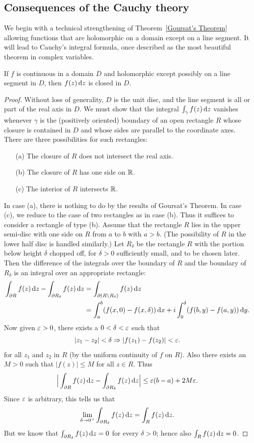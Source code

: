 \subsection{Consequences of the Cauchy theory}
We begin with a technical strengthening of Theorem~\ref{Goursat's Theorem} allowing functions that are holomorphic on a domain except on a line segment. It will lead to Cauchy's integral formula, once described as the most beautiful theorem in complex variables.
\begin{theorem}\label{Goursat's Theorem Strengthened}
If $f$ is continuous in a domain $D$ and holomorphic except possibly on a line segment in $D$, then $f(z)\mathop{}\!\mathrm{d} z$ is closed in $D$.
\end{theorem}
\begin{proof}
Without loss of generality, $D$ is the unit disc, and the line segment is all or part of the real axis in $D$. We must show that the integral $\int_{\gamma}f(z)\mathop{}\!\mathrm{d} z$ vanishes whenever $\gamma$ is the (positively oriented) boundary of an open rectangle $R$ whose closure is contained in $D$ and whose sides are parallel to the coordinate axes. There are three possibilities for such rectangles:
\begin{itemize}
\item[(a)] The closure of $R$ does not intersect the real axis.
\item[(b)] The closure of $R$ has one side on $\mathbb{R}$.
\item[(c)] The interior of $R$ intersects $\mathbb{R}$.
\end{itemize}
In case (a), there is nothing to do by the results of Goursat's Theorem. In case (c), we reduce to the case of two rectangles as in case (b). Thus it suffices to consider a rectangle of type (b). Assume that the rectangle $R$ lies in the upper semi-disc with one side on $R$ from $a$ to $b$ with $a>b$. (The possibility of $R$ in the lower half disc is handled similarly.) Let $R_{\delta}$ be the rectangle $R$ with the portion below height $\delta$ chopped off, for $\delta>0$ sufficiently small, and to be chosen later. Then the difference of the integrals over the boundary of $R$ and the boundary of $R_{\delta}$ is an integral over an appropriate rectangle:
\begin{align*}
\int_{\partial R}f(z)\mathop{}\!\mathrm{d} z-\int_{\partial R_{\delta}}f(z)\mathop{}\!\mathrm{d} z&=\int_{\partial(R\setminus R_{\delta})}f(z)\mathop{}\!\mathrm{d} z\\
&=\int_{a}^{b}(f(x,0)-f(x,\delta))\mathop{}\!\mathrm{d} x+i\int_{0}^{\delta}(f(b,y)-f(a,y))\mathop{}\!\mathrm{d} y.
\end{align*}
Now given $\varepsilon>0$, there exists a $0<\delta<\varepsilon$ such that
\[|z_1-z_2|<\delta\Rightarrow|f(z_1)-f(z_2)|<\varepsilon.\]
for all $z_1$ and $z_2$ in $R$ (by the uniform continuity of $f$ on $R$). Also there exists an $M>0$ such that $|f(z)|\leq M$ for all $z\in R$. Thus
\[\Big|\int_{\partial R}f(z)\mathop{}\!\mathrm{d} z-\int_{\partial R_{\delta}}f(z)\mathop{}\!\mathrm{d} z\Big|\leq\varepsilon(b-a)+2M\varepsilon.\]
Since $\varepsilon$ is arbitrary, this tells us that
\[\lim_{\delta\to 0^+}\int_{\partial R_{\delta}}f(z)\mathop{}\!\mathrm{d} z=\int_{R}f(z)\mathop{}\!\mathrm{d} z.\]
But we know that $\int_{\partial R_{\delta}}f(z)\mathop{}\!\mathrm{d} z=0$ for every $\delta>0$; hence also $\int_{R}f(z)\mathop{}\!\mathrm{d} z=0$.
\end{proof}

